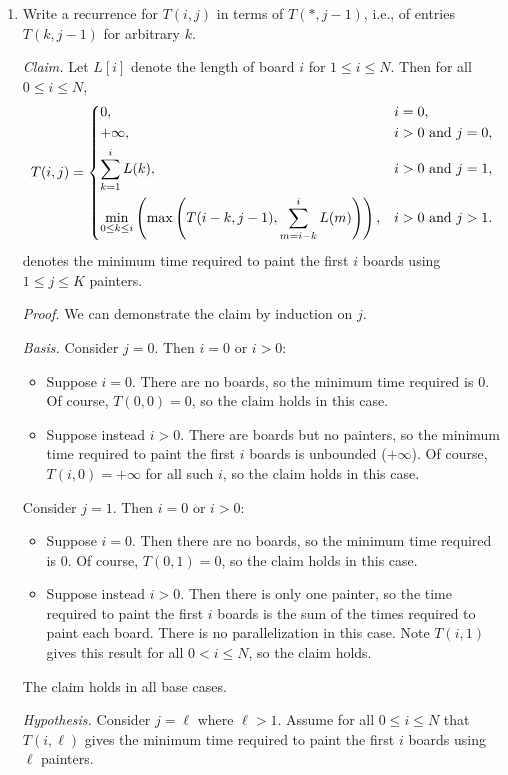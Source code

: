 \begin{enumerate}
\item Write a recurrence for $T(i,j)$ in terms of $T(*,j-1)$, i.e., of entries $T(k,j-1)$ for arbitrary $k$.
\begin{solution}
\textit{Claim. }Let $L[i]$ denote the length of board $i$ for $1\leq i\leq N$. Then for all $0\leq i\leq N$,
\begin{align*}
T(i,j)=\begin{dcases}
0,&i=0,\\
+\infty,&i>0\text{ and }j=0,\\
\sum_{k=1}^iL(k),&i>0\text{ and }j=1,\\
\min_{0\leq k\leq i}\left(\max\left(T(i-k,j-1),\sum_{m=i-k}^i{L(m)}\right)\right),&i>0\text{ and }j>1.
\end{dcases}
\end{align*}
denotes the minimum time required to paint the first $i$ boards using $1\leq j\leq K$ painters. 

\textit{Proof. }We can demonstrate the claim by induction on $j$.

\textit{Basis. }
Consider $j=0$. Then $i=0$ or $i>0$:
\begin{itemize}
    \item Suppose $i=0$. There are no boards, so the minimum time required is $0$. Of course, $T(0,0)=0$, so the claim holds in this case.
    \item Suppose instead $i>0$. There are boards but no painters, so the minimum time required to paint the first $i$ boards is unbounded ($+\infty$). Of course, $T(i,0)=+\infty$ for all such $i$, so the claim holds in this case.
\end{itemize}
Consider $j=1$. Then $i=0$ or $i>0$:
\begin{itemize}
    \item Suppose $i=0$. Then there are no boards, so the minimum time required is $0$. Of course, $T(0,1)=0$, so the claim holds in this case.
    \item Suppose instead $i>0$. Then there is only one painter, so the time required to paint the first $i$ boards is the sum of the times required to paint each board. There is no parallelization in this case. Note $T(i,1)$ gives this result for all $0<i\leq N$, so the claim holds.
\end{itemize}
The claim holds in all base cases.

\textit{Hypothesis. }Consider $j=\ell$ where $\ell>1$. Assume for all $0\leq i\leq N$ that $T(i,\ell)$ gives the minimum time required to paint the first $i$ boards using $\ell$ painters.


\end{solution}
\end{enumerate}
